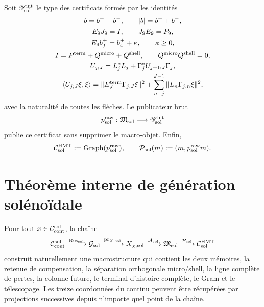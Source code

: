 Soit \(\mathscr Y_{\rm sol}^{\rm int}\) le type des certificats formés par
les identités
\begin{equation}\label{eq:pdfv2-sol-certificate-list}
 \begin{gathered}
 b=b^+-b^-,\qquad |b|=b^++b^-,\\
 E_9J_9=I,\qquad J_9E_9=P_9,\\
 E_9b_f^\pm=b_c^\pm+\kappa,\qquad\kappa\geq0,\\
 I=P^{\rm term}+Q^{\rm micro}+Q^{\rm shell},
 \qquad Q^{\rm micro}Q^{\rm shell}=0,\\
 U_{j;J}=L_j^*L_j+\Gamma_j^*U_{j+1;J}\Gamma_j,\\
 \langle U_{j;J}\xi,\xi\rangle
 =\|E_J^{\rm term}\Gamma_{j:J}\xi\|^2
  +\sum_{n=j}^{J-1}\|L_n\Gamma_{j:n}\xi\|^2,
 \end{gathered}
\end{equation}
avec la naturalité de toutes les flèches. Le publicateur brut
\begin{equation}\label{eq:pdfv2-sol-publisher}
 p_{\rm sol}^{\rm raw}:\mathfrak M_{\rm sol}
 \longrightarrow\mathscr Y_{\rm sol}^{\rm int}
\end{equation}
publie ce certificat sans supprimer le macro-objet. Enfin,
\begin{equation}\label{eq:pdfv2-sol-output-graph}
 \mathcal C_{\rm sol}^{\rm HMT}
 :=\operatorname{Graph}(p_{\rm sol}^{\rm raw}),
 \qquad
 \mathcal P_{\rm sol}(m):=(m,p_{\rm sol}^{\rm raw}m).
\end{equation}

\section{Théorème interne de génération solénoïdale}
\label{sec:pdfv2-sol-theorem}

\begin{theorem}
\label{thm:pdfv2-sol-internal-generation}
Pour tout \(x\in\mathcal C_{\rm cont}^{\rm sol}\), la chaîne
\[
 \mathcal C_{\rm cont}^{\rm sol}
 \xrightarrow{\operatorname{Res}_{\rm sol}}
 \mathcal G_{\rm sol}
 \xrightarrow{\operatorname{pr}_{X,{\rm sol}}}
 X_{\chi,{\rm sol}}
 \xrightarrow{\mathcal A_{\rm sol}}
 \mathfrak M_{\rm sol}
 \xrightarrow{\mathcal P_{\rm sol}}
 \mathcal C_{\rm sol}^{\rm HMT}
\]
construit naturellement une macrostructure qui contient les deux mémoires,
la retenue de compensation, la séparation orthogonale micro/shell, la ligne complète
de pertes, la colonne future, le terminal d'histoire complète, le Gram et le
télescopage. Les treize coordonnées du continu peuvent être récupérées par
projections successives depuis n'importe quel point de la chaîne.
\end{theorem}

